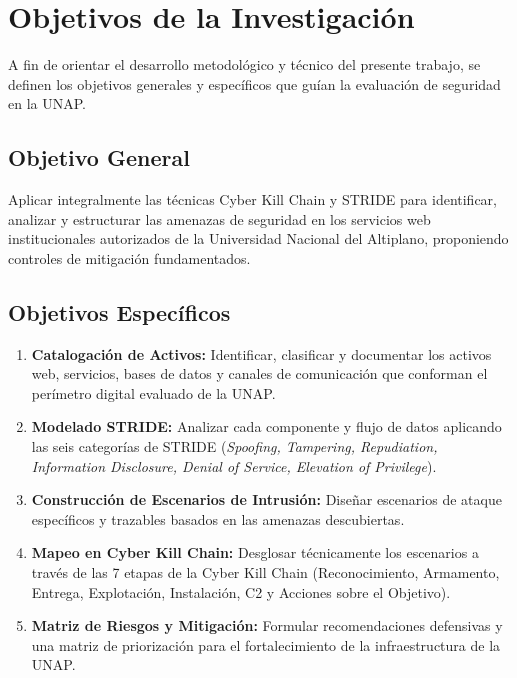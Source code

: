 \chapter{Objetivos de la Investigación}
\label{ch:objetivos}

A fin de orientar el desarrollo metodológico y técnico del presente trabajo, se definen los objetivos generales y específicos que guían la evaluación de seguridad en la UNAP.

\section{Objetivo General}
Aplicar integralmente las técnicas Cyber Kill Chain y STRIDE para identificar, analizar y estructurar las amenazas de seguridad en los servicios web institucionales autorizados de la Universidad Nacional del Altiplano, proponiendo controles de mitigación fundamentados.

\section{Objetivos Específicos}
\begin{enumerate}
    \item \textbf{Catalogación de Activos:} Identificar, clasificar y documentar los activos web, servicios, bases de datos y canales de comunicación que conforman el perímetro digital evaluado de la UNAP.
    \item \textbf{Modelado STRIDE:} Analizar cada componente y flujo de datos aplicando las seis categorías de STRIDE (\textit{Spoofing, Tampering, Repudiation, Information Disclosure, Denial of Service, Elevation of Privilege}).
    \item \textbf{Construcción de Escenarios de Intrusión:} Diseñar escenarios de ataque específicos y trazables basados en las amenazas descubiertas.
    \item \textbf{Mapeo en Cyber Kill Chain:} Desglosar técnicamente los escenarios a través de las 7 etapas de la Cyber Kill Chain (Reconocimiento, Armamento, Entrega, Explotación, Instalación, C2 y Acciones sobre el Objetivo).
    \item \textbf{Matriz de Riesgos y Mitigación:} Formular recomendaciones defensivas y una matriz de priorización para el fortalecimiento de la infraestructura de la UNAP.
\end{enumerate}
